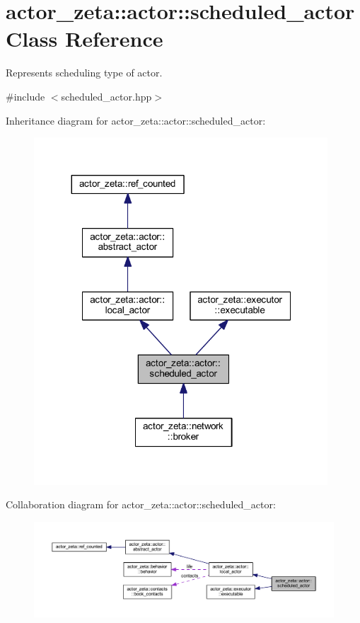 \hypertarget{classactor__zeta_1_1actor_1_1scheduled__actor}{}\section{actor\+\_\+zeta\+:\+:actor\+:\+:scheduled\+\_\+actor Class Reference}
\label{classactor__zeta_1_1actor_1_1scheduled__actor}


Represents scheduling type of actor.  




{\ttfamily \#include $<$scheduled\+\_\+actor.\+hpp$>$}



Inheritance diagram for actor\+\_\+zeta\+:\+:actor\+:\+:scheduled\+\_\+actor\+:\nopagebreak
\begin{figure}[H]
\begin{center}
\leavevmode
\includegraphics[width=311pt]{classactor__zeta_1_1actor_1_1scheduled__actor__inherit__graph}
\end{center}
\end{figure}


Collaboration diagram for actor\+\_\+zeta\+:\+:actor\+:\+:scheduled\+\_\+actor\+:\nopagebreak
\begin{figure}[H]
\begin{center}
\leavevmode
\includegraphics[width=350pt]{classactor__zeta_1_1actor_1_1scheduled__actor__coll__graph}
\end{center}
\end{figure}
